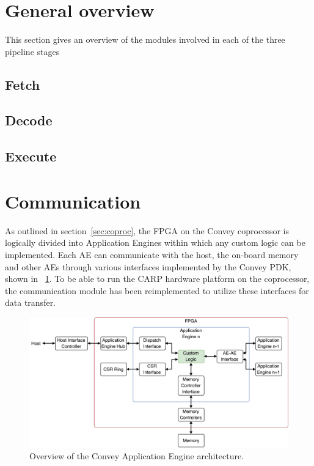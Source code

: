 \section{General overview}

This section gives an overview of the modules involved in each of the three
pipeline stages

\subsection{Fetch}

\subsection{Decode}

\subsection{Execute}

\clearpage

\section{Communication}

As outlined in section~\ref{sec:coproc}, the FPGA on the Convey coprocessor is
logically divided into Application Engines within which any custom logic can be
implemented. Each AE can communicate with the host, the on-board memory and
other AEs through various interfaces implemented by the Convey PDK, shown in
\figurename~\ref{fig:convey-ae-io-overview}. To be able to run the CARP hardware
platform on the coprocessor, the communication module has been reimplemented to
utilize these interfaces for data transfer.

\begin{figure}[ht]
  \centering
  \includegraphics[width=\linewidth]{fig/convey-ae-io-overview}
  \caption{Overview of the Convey Application Engine architecture.}
  \label{fig:convey-ae-io-overview}
\end{figure}

